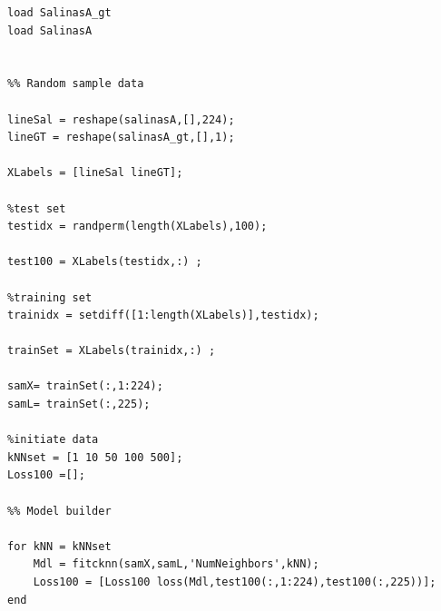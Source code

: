 \documentclass{article}
\begin{document}
\begin{lstlisting}
load SalinasA_gt
load SalinasA


%% Random sample data

lineSal = reshape(salinasA,[],224);
lineGT = reshape(salinasA_gt,[],1);

XLabels = [lineSal lineGT];

%test set
testidx = randperm(length(XLabels),100);

test100 = XLabels(testidx,:) ;

%training set
trainidx = setdiff([1:length(XLabels)],testidx);

trainSet = XLabels(trainidx,:) ;

samX= trainSet(:,1:224);
samL= trainSet(:,225);

%initiate data
kNNset = [1 10 50 100 500];
Loss100 =[];

%% Model builder

for kNN = kNNset
    Mdl = fitcknn(samX,samL,'NumNeighbors',kNN);
    Loss100 = [Loss100 loss(Mdl,test100(:,1:224),test100(:,225))];
end
\end{lstlisting}
\end{document}

